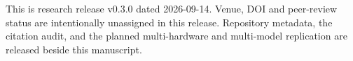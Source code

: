 \documentclass[conference]{IEEEtran}
\begin{document}
This is research release v0.3.0 dated 2026-09-14. Venue, DOI and peer-review
status are intentionally unassigned in this release. Repository metadata, the
citation audit, and the planned multi-hardware and multi-model replication are
released beside this manuscript.



\end{document}
